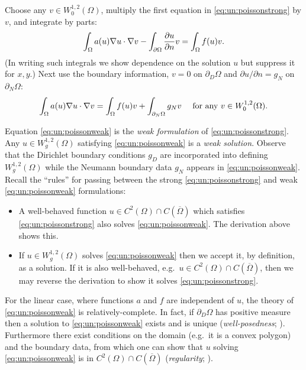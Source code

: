 Choose any $v\in W^{1,2}_0(\Omega)$, multiply the first equation in \eqref{eq:un:poissonstrong} by $v$, and integrate by parts:
\begin{equation*}
\int_\Omega a(u) \nabla u \cdot \nabla v - \int_{\partial\Omega} \frac{\partial u}{\partial n} v = \int_\Omega f(u) v.
\end{equation*}
(In writing such integrals we show dependence on the solution $u$ but suppress it for $x,y$.)  Next use the boundary information, $v=0$ on $\partial_D\Omega$ and $\partial u/\partial n=g_N$ on $\partial_N\Omega$:
\begin{equation}
\int_\Omega a(u) \nabla u \cdot \nabla v = \int_\Omega f(u) v + \int_{\partial_N\Omega} g_N v\quad \text{ for any } v\in W^{1,2}_0(\Omega). \label{eq:un:poissonweak}
\end{equation}

Equation \eqref{eq:un:poissonweak} is the \emph{weak formulation} of \eqref{eq:un:poissonstrong}.  Any $u \in W^{1,2}_g(\Omega)$ satisfying \eqref{eq:un:poissonweak} is a \emph{weak solution}.  Observe that the Dirichlet boundary conditions $g_D$ are incorporated into defining $W^{1,2}_g(\Omega)$ while the Neumann boundary data $g_N$ appears in \eqref{eq:un:poissonweak}.  Recall the ``rules'' for passing between the strong \eqref{eq:un:poissonstrong} and weak \eqref{eq:un:poissonweak} formulations:\begin{itemize}
\item A well-behaved function $u \in C^2(\Omega) \cap C(\overline \Omega)$ which satisfies \eqref{eq:un:poissonstrong} also solves \eqref{eq:un:poissonweak}.  The derivation above shows this.
\item If $u \in W^{1,2}_g(\Omega)$ solves \eqref{eq:un:poissonweak} then we accept it, by definition, as a solution.   If it is also well-behaved, e.g.~$u \in C^2(\Omega) \cap C(\overline \Omega)$, then we may reverse the derivation to show it solves \eqref{eq:un:poissonstrong}.
\end{itemize}

For the linear case, where functions $a$ and $f$ are independent of $u$, the theory of \eqref{eq:un:poissonweak} is relatively-complete.  In fact, if $\partial_D \Omega$ has positive measure then a solution to \eqref{eq:un:poissonweak} exists and is unique (\emph{well-posedness}; \citep{Ciarlet2002,Evans2010}).  Furthermore there exist conditions on the domain (e.g.~it is a convex polygon) and the boundary data, from which one can show that $u$ solving \eqref{eq:un:poissonweak} is in $C^2(\Omega) \cap C(\overline \Omega)$ (\emph{regularity}; \citep{Evans2010}).

